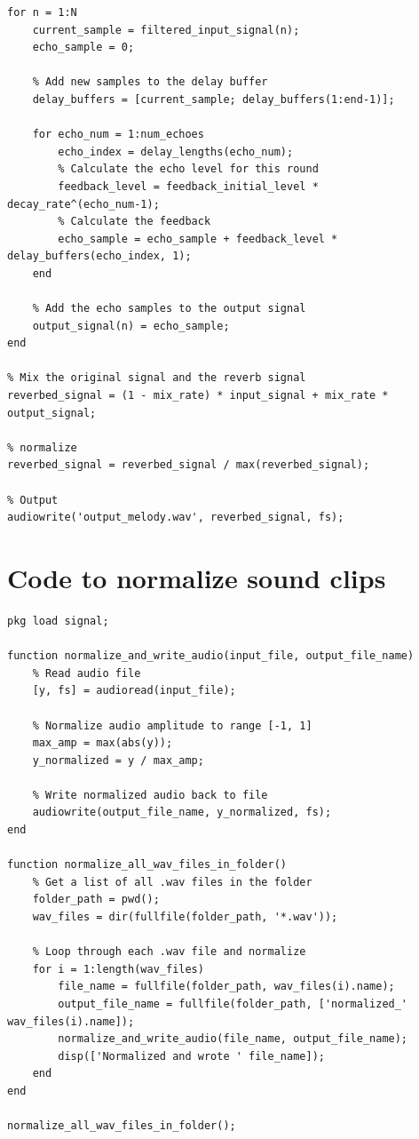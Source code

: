 \documentclass[12pt]{article}
\begin{document}
\begin{lstlisting}
for n = 1:N
    current_sample = filtered_input_signal(n);
    echo_sample = 0;

    % Add new samples to the delay buffer
    delay_buffers = [current_sample; delay_buffers(1:end-1)];

    for echo_num = 1:num_echoes
        echo_index = delay_lengths(echo_num);
        % Calculate the echo level for this round
        feedback_level = feedback_initial_level * decay_rate^(echo_num-1);
        % Calculate the feedback
        echo_sample = echo_sample + feedback_level * delay_buffers(echo_index, 1);
    end

    % Add the echo samples to the output signal
    output_signal(n) = echo_sample;
end

% Mix the original signal and the reverb signal
reverbed_signal = (1 - mix_rate) * input_signal + mix_rate * output_signal;

% normalize
reverbed_signal = reverbed_signal / max(reverbed_signal);

% Output
audiowrite('output_melody.wav', reverbed_signal, fs);

\end{lstlisting}

\section{Code to normalize sound clips}

\begin{lstlisting}
pkg load signal;

function normalize_and_write_audio(input_file, output_file_name)
    % Read audio file
    [y, fs] = audioread(input_file);

    % Normalize audio amplitude to range [-1, 1]
    max_amp = max(abs(y));
    y_normalized = y / max_amp;

    % Write normalized audio back to file
    audiowrite(output_file_name, y_normalized, fs);
end

function normalize_all_wav_files_in_folder()
    % Get a list of all .wav files in the folder
    folder_path = pwd();
    wav_files = dir(fullfile(folder_path, '*.wav'));

    % Loop through each .wav file and normalize
    for i = 1:length(wav_files)
        file_name = fullfile(folder_path, wav_files(i).name);
        output_file_name = fullfile(folder_path, ['normalized_' wav_files(i).name]);
        normalize_and_write_audio(file_name, output_file_name);
        disp(['Normalized and wrote ' file_name]);
    end
end

normalize_all_wav_files_in_folder();
\end{lstlisting}
\end{document}
